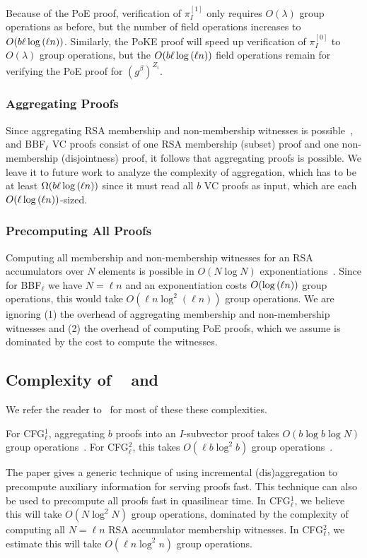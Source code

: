 Because of the PoE proof, verification of $\pi_I^{[1]}$ only requires $O(\lambda)$ group operations as before, but the number of field operations increases to $O(b\ell\log{(\ell n)})$.
Similarly, the PoKE proof will speed up verification of $\pi_I^{[0]}$ to $O(\lambda)$ group operations, but the $O(b\ell\log{(\ell n)})$ field operations remain for verifying the PoE proof for $\left(g^{\beta}\right)^{Z_i}$.

\subsubsection{Aggregating Proofs}
Since aggregating RSA membership and non-membership witnesses is possible~\cite{BBF18}, and BBF$_\ell$ VC proofs consist of one RSA membership (subset) proof and one non-membership (disjointness) proof, it follows that aggregating proofs is possible.
We leave it to future work to analyze the complexity of aggregation, which has to be at least $\Omega(b\ell\log{(\ell n)})$ since it must read all $b$ VC proofs as input, which are each $O(\ell\log{(\ell n)})$-sized.

\subsubsection{Precomputing All Proofs}
Computing all membership and non-membership witnesses for an RSA accumulators over $N$ elements is possible in $O(N\log{N})$ exponentiations~\cite{BBF18,SSY01}.
Since for BBF$_\ell$ we have $N=\ell n$ and an exponentiation costs $O(\log{(\ell n)})$ group operations, this would take $O(\ell n \log^2{(\ell n)})$ group operations.
We are ignoring (1) the overhead of aggregating membership and non-membership witnesses and (2) the overhead of computing PoE proofs, which we assume is dominated by the cost to compute the witnesses.

\subsection{Complexity of \cfgOne~\cite{CFG+20} and \cfgTwo~\cite{CF13,LM19,CFG+20}}

We refer the reader to~\cite[Table 1, pg. 35]{CFG+20} for most of these these complexities.

For CFG$_{\ell}^1$, aggregating $b$ proofs into an $I$-subvector proof takes $O(b\log{b}\log{N})$ group operations~\cite[Sec 5.1, pg. 23]{CFG+20}.
For CFG$_{\ell}^2$, this takes $O(\ell b\log^2{b})$ group operations~\cite[Sec 5.2, pg. 32]{CFG+20}.

The paper gives a generic technique of using incremental (dis)aggregation to precompute auxiliary information for serving proofs fast.
This technique can also be used to precompute all proofs fast in quasilinear time.
In CFG$_\ell^{1}$, we believe this will take $O(N\log^2{N})$ group operations, dominated by the complexity of computing all $N=\ell n$ RSA accumulator membership witnesses.
In CFG$_\ell^{2}$, we estimate this will take $O(\ell n\log^2{n})$ group operations.
